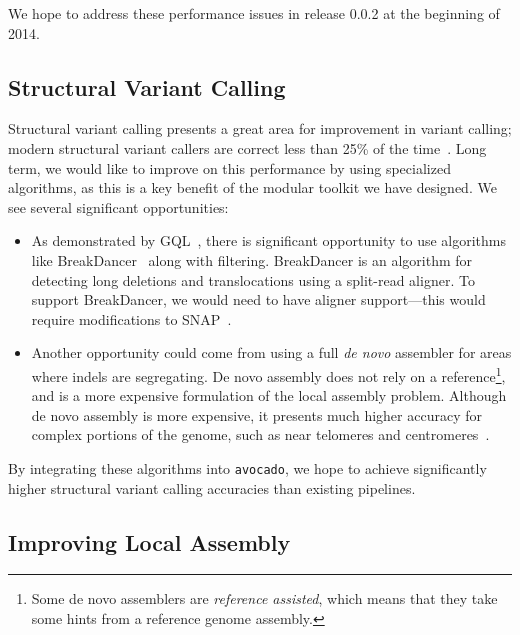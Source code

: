 \documentclass{acm_proc_article-sp}
\begin{document}
We hope to address these performance issues in release 0.0.2 at the beginning of 2014.

\subsection{Structural Variant Calling}
\label{sec:structural-variant-callling}

Structural variant calling presents a great area for improvement in variant calling; modern structural variant callers are correct less than
25\% of the time~\cite{talwalkar13}. Long term, we would like to improve on this performance by using specialized algorithms, as this
is a key benefit of the modular toolkit we have designed. We see several significant opportunities:

\begin{itemize}
\item As demonstrated by GQL~\cite{kozanitis13}, there is significant opportunity to use algorithms like BreakDancer~\cite{chen09}
along with filtering. BreakDancer is an algorithm for detecting long deletions and translocations using a split-read aligner. To support
BreakDancer, we would need to have aligner support---this would require modifications to SNAP~\cite{zaharia11}.
\item Another opportunity could come from using a full \emph{de novo} assembler for areas where indels are segregating. De novo
assembly does not rely on a reference\footnote{Some de novo assemblers are \emph{reference assisted}, which means that they take
some hints from a reference genome assembly.}, and is a more expensive formulation of the local assembly problem. Although
de novo assembly is more expensive, it presents much higher accuracy for complex portions of the genome, such as near telomeres
and centromeres~\cite{bresler12}.
\end{itemize}

By integrating these algorithms into \texttt{avocado}, we hope to achieve significantly higher structural variant calling accuracies
than existing pipelines.

\subsection{Improving Local Assembly}
\label{sec:improving-local-assembly}
\end{document}
